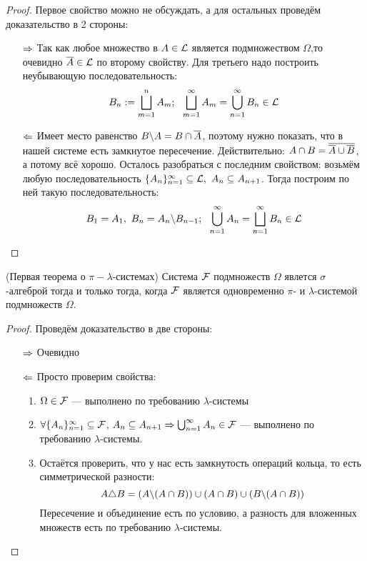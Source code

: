 \begin{proof}
	Первое свойство можно не обсуждать, а для остальных проведём доказательство в 2 стороны:
	\begin{itemize}
		\item[$\Rightarrow$] Так как любое множество в $A \in \mathcal{L}$ является подмножеством $\Omega$,то очевидно $\overline{A} \in \mathcal{L}$ по второму свойству. Для третьего надо построить неубывающую последовательность:
		\[
			B_n := \bigsqcup_{m = 1}^n A_m;\ \ \bigsqcup_{m = 1}^\infty A_m = \bigcup_{n = 1}^\infty B_n \in \mathcal{L}
		\]
		
		\item[$\Leftarrow$] Имеет место равенство $B \backslash A = B \cap \overline{A}$, поэтому нужно показать, что в нашей системе есть замкнутое пересечение. Действительно: $A \cap B = \overline{\overline{A} \cup \overline{B}}$, а потому всё хорошо. Осталось разобраться с последним свойством: возьмём любую последовательность $\{A_n\}_{n = 1}^\infty \subseteq \mathcal{L},\ A_n \subseteq A_{n + 1}$. Тогда построим по ней такую последовательность:
		\[
			B_1 = A_1,\ B_n = A_n \bs B_{n - 1};\ \ \bigcup_{n = 1}^\infty A_n = \bscup_{n = 1}^\infty B_n \in \cL
		\]
	\end{itemize}
\end{proof}

\begin{theorem} (Первая теорема о $\pi-\lambda$-системах)
	Система $\mathcal{F}$ подмножеств $\Omega$ явлется $\sigma$-алгеброй тогда и только тогда, когда $\mathcal{F}$ является одновременно $\pi$- и $\lambda$-системой подмножеств $\Omega$.
\end{theorem}

\begin{proof}
	Проведём доказательство в две стороны:
	\begin{itemize}
		\item[$\Rightarrow$] Очевидно
		
		\item[$\Leftarrow$] Просто проверим свойства:
		\begin{enumerate}
			\item $\Omega \in \mathcal{F}$ --- выполнено по требованию $\lambda$-системы
			
			\item $\forall \{A_n\}_{n = 1}^\infty \subseteq \mathcal{F}$, $A_n \subseteq A_{n + 1} \Rightarrow \bigcup_{n = 1}^\infty A_n \in \mathcal{F}$ --- выполнено по требованию $\lambda$-системы.
			
			\item Остаётся проверить, что у нас есть замкнутость операций кольца, то есть симметрической разности:
			\[
				A \triangle B = (A \backslash (A \cap B)) \cup (A \cap B) \cup (B \backslash (A \cap B))
			\]
			Пересечение и объединение есть по условию, а разность для вложенных множеств есть по требованию $\lambda$-системы.
		\end{enumerate}
	\end{itemize}
\end{proof}

